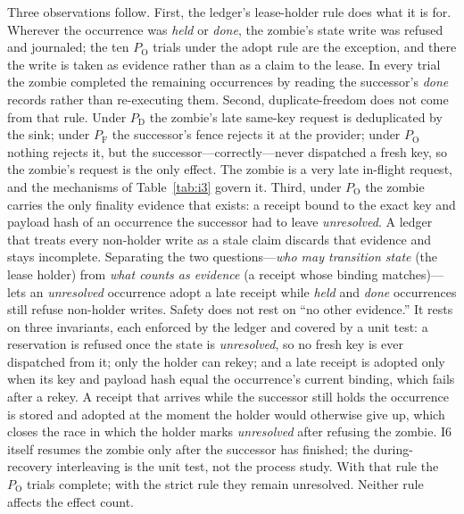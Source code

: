 \documentclass[conference,10pt]{IEEEtran}
\newcommand{\PD}{P_{\mathrm{D}}}
\newcommand{\PF}{P_{\mathrm{F}}}
\newcommand{\PO}{P_{\mathrm{O}}}
\begin{document}
Three observations follow. First, the ledger's lease-holder rule does what it is for. Wherever the occurrence was \emph{held} or \emph{done}, the zombie's state write was refused and journaled; the ten $\PO$ trials under the adopt rule are the exception, and there the write is taken as evidence rather than as a claim to the lease. In every trial the zombie completed the remaining occurrences by reading the successor's \emph{done} records rather than re-executing them. Second, duplicate-freedom does not come from that rule. Under $\PD$ the zombie's late same-key request is deduplicated by the sink; under $\PF$ the successor's fence rejects it at the provider; under $\PO$ nothing rejects it, but the successor---correctly---never dispatched a fresh key, so the zombie's request is the only effect. The zombie is a very late in-flight request, and the mechanisms of Table~\ref{tab:i3} govern it. Third, under $\PO$ the zombie carries the only finality evidence that exists: a receipt bound to the exact key and payload hash of an occurrence the successor had to leave \emph{unresolved}. A ledger that treats every non-holder write as a stale claim discards that evidence and stays incomplete. Separating the two questions---\emph{who may transition state} (the lease holder) from \emph{what counts as evidence} (a receipt whose binding matches)---lets an \emph{unresolved} occurrence adopt a late receipt while \emph{held} and \emph{done} occurrences still refuse non-holder writes. Safety does not rest on ``no other evidence.'' It rests on three invariants, each enforced by the ledger and covered by a unit test: a reservation is refused once the state is \emph{unresolved}, so no fresh key is ever dispatched from it; only the holder can rekey; and a late receipt is adopted only when its key and payload hash equal the occurrence's current binding, which fails after a rekey. A receipt that arrives while the successor still holds the occurrence is stored and adopted at the moment the holder would otherwise give up, which closes the race in which the holder marks \emph{unresolved} after refusing the zombie. I6 itself resumes the zombie only after the successor has finished; the during-recovery interleaving is the unit test, not the process study. With that rule the $\PO$ trials complete; with the strict rule they remain unresolved. Neither rule affects the effect count.
\end{document}
